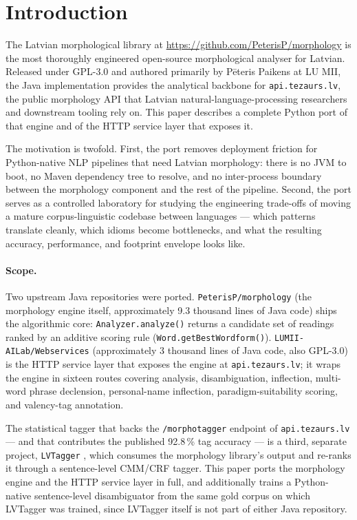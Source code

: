 \documentclass[11pt,a4paper]{article}
\begin{document}
\section{Introduction}

The Latvian morphological library at
\url{https://github.com/PeterisP/morphology} \cite{paikens2018} is the
most thoroughly engineered open-source morphological analyser for
Latvian. Released under GPL-3.0 and authored primarily by Pēteris
Paikens at LU MII, the Java implementation provides the analytical
backbone for \texttt{api.tezaurs.lv}, the public morphology API
that Latvian natural-language-processing researchers and downstream
tooling rely on. This paper describes a complete Python port of that
engine and of the HTTP service layer that exposes it.

The motivation is twofold. First, the port removes deployment friction
for Python-native NLP pipelines that need Latvian morphology: there is
no JVM to boot, no Maven dependency tree to resolve, and no
inter-process boundary between the morphology component and the rest
of the pipeline. Second, the port serves as a controlled laboratory
for studying the engineering trade-offs of moving a mature
corpus-linguistic codebase between languages --- which patterns
translate cleanly, which idioms become bottlenecks, and what the
resulting accuracy, performance, and footprint envelope looks like.

\paragraph{Scope.} Two upstream Java repositories were ported.
\texttt{PeterisP/morphology} (the morphology engine itself,
approximately 9.3 thousand lines of Java code) ships the algorithmic
core: \texttt{Analyzer.analyze()} returns a candidate set of readings
ranked by an additive scoring rule
(\texttt{Word.getBestWordform()}). \texttt{LUMII-AILab/Webservices}
\cite{lumii_webservices} (approximately 3 thousand lines of Java
code, also GPL-3.0) is the HTTP service layer that exposes the
engine at \texttt{api.tezaurs.lv}; it wraps the engine in sixteen
routes covering analysis, disambiguation, inflection, multi-word
phrase declension, personal-name inflection, paradigm-suitability
scoring, and valency-tag annotation.

The statistical tagger that backs the \texttt{/morphotagger} endpoint
of \texttt{api.tezaurs.lv} --- and that contributes the published
92.8\,\% tag accuracy --- is a third, separate project,
\texttt{LVTagger} \cite{paikens2013}, which consumes the morphology
library's output and re-ranks it through a sentence-level CMM/CRF
tagger. This paper ports the morphology engine and the HTTP service
layer in full, and additionally trains a Python-native sentence-level
disambiguator from the same gold corpus on which LVTagger was trained,
since LVTagger itself is not part of either Java repository.
\end{document}
